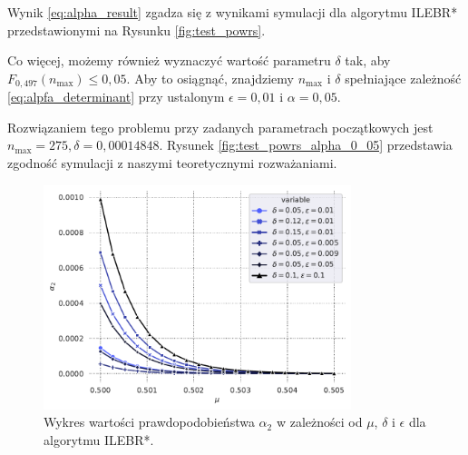 \documentclass[inzynierska]{pwr_wmat_praca_dyplomowa}
\theoremstyle{plain}
\numberwithin{theorem}{chapter}
\theoremstyle{definition}
\numberwithin{theorem}{chapter}
\newcommand{\nmax}{n_{\text{max}}}
\begin{document}
	Wynik \eqref{eq:alpha_result} zgadza się z wynikami symulacji dla algorytmu ILEBR* przedstawionymi na Rysunku \ref{fig:test_powrs}.
	
	Co więcej, możemy również wyznaczyć wartość parametru $\delta$ tak, aby $F_{0,497}(\nmax) \le 0,05$. Aby to osiągnąć, znajdziemy $\nmax$ i $\delta$ spełniające zależność \eqref{eq:alpfa_determinant} przy ustalonym $\epsilon = 0,01$ i $\alpha=0,05$.
	
	Rozwiązaniem tego problemu przy zadanych parametrach początkowych jest $\nmax = 275, \delta = 0,00014848$. Rysunek \ref{fig:test_powrs_alpha_0_05} przedstawia zgodność symulacji z naszymi teoretycznymi rozważaniami.
	\begin{figure}
		\centering
		\includegraphics[width=0.8\textwidth]{imagens/alpha_2.pdf}
		\caption{Wykres wartości prawdopodobieństwa $\alpha_2$ w zależności od $\mu$, $\delta$ i $\epsilon$ dla algorytmu ILEBR*.}
		\label{fig:a2_probability}
	\end{figure}
\end{document}
